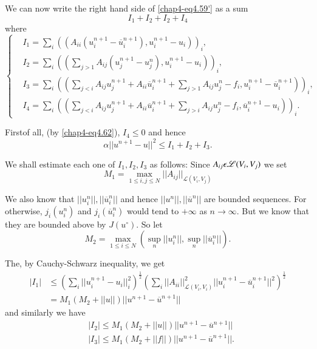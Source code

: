 We can now write the right hand side of \ref{chap4-eq4.59'} as a sum
\begin{equation*}
I_{1} + I_{2} + I_{2} + I_{4}\tag*{$(4.59)''$}
\end{equation*}
where
\begin{equation*}
\begin{cases}
& I_{1} = \sum\limits_{i} ((A_{ii}(u_{i}^{n+1}-\overline{u}_{i}^{n+1}), u_{i}^{n+1} -u_{i}))_{i},\\
& I_{2} = \sum\limits_{i} ((\sum\limits_{j>1} A_{ij} (u_{j}^{n+1}-u_{j}^{n}), u_{i}^{n+1}-u_{i}))_{i},\\
& I_{3} = \sum\limits_{i} ((\sum\limits_{j<i} A_{ij} u_{j}^{n+1} + A_{ii} \overline{u}_{i}^{n+1} + \sum\limits_{j>1} A_{ij} u_{j}^{n} - f_{i}, u_{i}^{n+1} - \overline{u}_{i}^{n+1}))_{i},\\
& I_{4} = \sum\limits_{i} ((\sum\limits_{j<i} A_{ij} u_{j}^{n+1} + A_{ii} \overline{u}_{i}^{n+1} + \sum\limits_{j>i} A_{ij} u_{j}^{n} - f_{i}, \overline{u}_{i}^{n+1} - u_{i}))_{i}.\tag{4.63}\label{chap4-eq4.63}
\end{cases}
\end{equation*}

First\pageoriginale of all, (by \ref{chap4-eq4.62}), $I_{4} \leq 0$ and hence
\begin{equation*}
\alpha ||u^{n+1}-u||^{2} \leq I_{1} + I_{2} + I_{3}.\tag{4.64}\label{chap4-eq4.64}
\end{equation*}

We shall estimate each one of $I_{1}, I_{2}, I_{3}$ as follows: Since
$A_{ij} \epsilon \mathscr{L}\break (V_{i}, V_{j})$ we set 
\begin{equation*}
M_{1} = \max_{1\leq i, j\leq N} || A_{ij} ||_{\mathscr{L}(V_{i}, V_{j})}\tag{4.65}\label{chap4-eq4.65}
\end{equation*}

We also know that $|| u_{i}^{n} ||, || \overline{u}_{i}^{n}||$ and hence $||u^{n}||, ||\overline{u}^{n}||$ are bounded sequences. For otherwise, $j_{i}(u_{i}^{n})$ and $j_{i}(\overline{u}_{i}^{n})$ would tend to $+ \infty$ as $n \to \infty$. But we know that they are bounded above by $J(u^{\circ})$. So let
\begin{equation*}
M_{2} = \max_{1 \leq i \leq N} (\sup_{n} ||u_{i}^{n}||, \sup_{n}||\overline{u}_{i}^{n}||).\tag{4.66}\label{chap4-eq4.66}
\end{equation*}

The, by Cauchy-Schwarz inequality, we get
\begin{align*}
|I_{1}| & \leq (\sum_{i} ||u_{i}^{n+1} - u_{i}||_{i}^{2})^{\frac{1}{2}} (\sum_{i} ||A_{ii}||^{2}_{\mathscr{L}(V_{i}, V_{i})} ||u_{i}^{n+1} -\overline{u}_{i}^{n+1}||^{2})^{\frac{1}{2}}\\
& = M_{1} (M_{2} + ||u||) ||u^{n+1} - \overline{u}^{n+1}||
\end{align*}
and similarly we have
\begin{align*}
& |I_{2}| \leq M_{1} (M_{2} + ||u||) ||u^{n+1} - \overline{u}^{n+1} ||\\
& |I_{3}| \leq M_{1} (M_{2} + ||f||) ||u^{n+1} - \overline{u}^{n+1} ||.
\end{align*}

